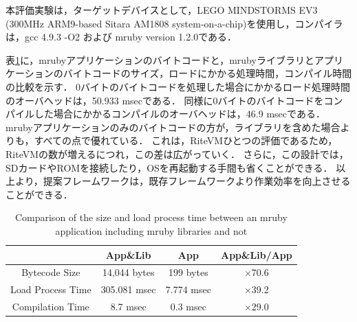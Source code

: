 \documentclass[submit]{ipsj_v2/UTF8/ipsj}
\begin{document}
本評価実験は，ターゲットデバイスとして，LEGO MINDSTORMS EV3 (300MHz ARM9-based Sitara AM1808 system-on-a-chip)を使用し，コンパイラは，gcc 4.9.3 -O2 および mruby version 1.2.0である．

表\ref{tab:size_and_time}に，mrubyアプリケーションのバイトコードと，mrubyライブラリとアプリケーションのバイトコードのサイズ，ロードにかかる処理時間，コンパイル時間の比較を示す．
0バイトのバイトコードを処理した場合にかかるロード処理時間のオーバヘッドは，50.933 msecである．
同様に0バイトのバイトコードをコンパイルした場合にかかるコンパイルのオーバヘッドは，46.9 msecである．
mrubyアプリケーションのみのバイトコードの方が，ライブラリを含めた場合よりも，すべての点で優れている．
これは，RiteVMひとつの評価であるため，RiteVMの数が増えるにつれ，この差は広がっていく．
さらに，この設計では，SDカードやROMを接続したり，OSを再起動する手間も省くことができる．
以上より，提案フレームワークは，既存フレームワークより作業効率を向上させることができる．


\begin{table}[t]
    \centering
    \caption{Comparison of the size and load process time between an mruby application including mruby libraries and not}
    \begin{tabular}{c||c|c|c}
                            & App\&Lib     & App        &   App\&Lib/App  \\ \hline
          Bytecode Size     & 14,044 bytes & 199 bytes  &   $\times$70.6          \\ %
          Load Process Time & 305.081 msec & 7.774 msec &   $\times$39.2          \\
          Compilation Time  & 8.7 msec     & 0.3 msec   &   $\times$29.0          \\
    \end{tabular}
    \label{tab:size_and_time}
\end{table}
\end{document}
